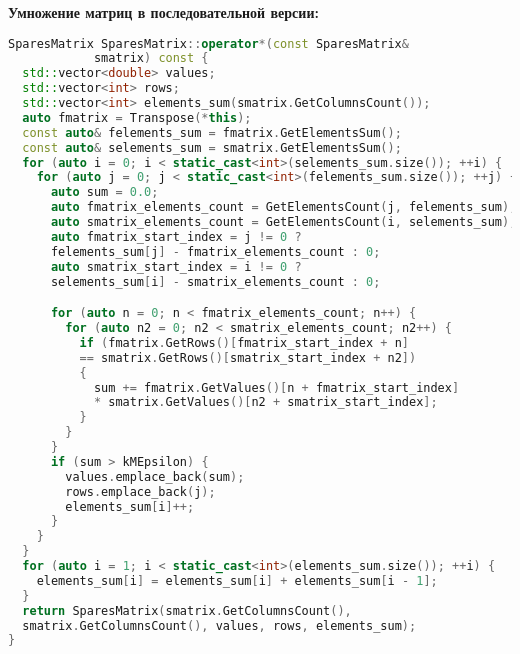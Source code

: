 \documentclass[12pt]{article}
\begin{document}
\textbf{Умножение матриц в последовательной версии:}

\begin{lstlisting}[language=C++]
SparesMatrix SparesMatrix::operator*(const SparesMatrix& 
            smatrix) const {
  std::vector<double> values;
  std::vector<int> rows;
  std::vector<int> elements_sum(smatrix.GetColumnsCount());
  auto fmatrix = Transpose(*this);
  const auto& felements_sum = fmatrix.GetElementsSum();
  const auto& selements_sum = smatrix.GetElementsSum();
  for (auto i = 0; i < static_cast<int>(selements_sum.size()); ++i) {
    for (auto j = 0; j < static_cast<int>(felements_sum.size()); ++j) {
      auto sum = 0.0;
      auto fmatrix_elements_count = GetElementsCount(j, felements_sum);
      auto smatrix_elements_count = GetElementsCount(i, selements_sum);
      auto fmatrix_start_index = j != 0 ? 
      felements_sum[j] - fmatrix_elements_count : 0;
      auto smatrix_start_index = i != 0 ? 
      selements_sum[i] - smatrix_elements_count : 0;

      for (auto n = 0; n < fmatrix_elements_count; n++) {
        for (auto n2 = 0; n2 < smatrix_elements_count; n2++) {
          if (fmatrix.GetRows()[fmatrix_start_index + n] 
          == smatrix.GetRows()[smatrix_start_index + n2]) 
          {
            sum += fmatrix.GetValues()[n + fmatrix_start_index]
            * smatrix.GetValues()[n2 + smatrix_start_index];
          }
        }
      }
      if (sum > kMEpsilon) {
        values.emplace_back(sum);
        rows.emplace_back(j);
        elements_sum[i]++;
      }
    }
  }
  for (auto i = 1; i < static_cast<int>(elements_sum.size()); ++i) {
    elements_sum[i] = elements_sum[i] + elements_sum[i - 1];
  }
  return SparesMatrix(smatrix.GetColumnsCount(), 
  smatrix.GetColumnsCount(), values, rows, elements_sum);
}
\end{lstlisting}
\end{document}
